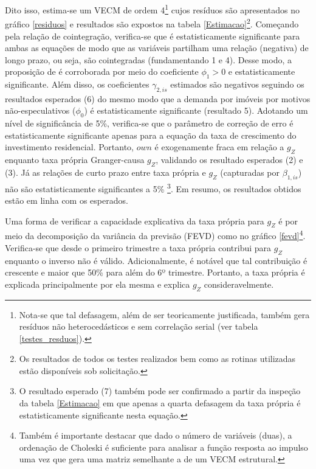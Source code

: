 Dito isso,  estima-se um VECM de ordem 4\footnote{Nota-se que tal defasagem, além de ser teoricamente justificada, também gera resíduos não heterocedásticos e sem correlação serial (ver tabela \ref{testes_resduos}).} cujos resíduos são apresentados no gráfico \ref{residuos} e resultados são expostos na tabela \ref{Estimacao}\footnote{Os resultados de todos os testes realizados bem como as rotinas utilizadas estão disponíveis sob solicitação.}.
Começando pela relação de cointegração, verifica-se que é estatisticamente significante para ambas as equações de modo que as variáveis partilham uma relação (negativa) de longo prazo, ou seja, são cointegradas (fundamentando 1 e 4).
Desse modo, a proposição de \textcite{teixeira_crescimento_2015} é corroborada por meio do coeficiente $\phi_1> 0$ e estatisticamente significante.
Além disso, os coeficientes $\gamma_{2,is}$ estimados são negativos seguindo os resultados esperados (6) do mesmo modo que a demanda por imóveis por motivos não-especulativos ($\phi_0$) é estatisticamente significante (resultado 5).
Adotando um nível de significância de 5\%, verifica-se que o parâmetro de correção de erro é estatisticamente significante apenas para a equação da taxa de crescimento do investimento residencial. Portanto, $own$ é exogenamente fraca em relação a $g_Z$ enquanto taxa própria Granger-causa $g_Z$, validando os resultado esperados (2) e (3).
Já as relações de curto prazo entre taxa própria e $g_Z$ (capturadas por $\beta_{1,is}$) não são estatisticamente significantes a 5\% \footnote{O resultado esperado (7) também pode ser confirmado a partir da inspeção da tabela \ref{Estimacao} em que apenas a quarta defasagem da taxa própria é estatisticamente significante nesta equação.}. Em resumo, os resultados obtidos estão em linha com os esperados. 

Uma forma de verificar a capacidade explicativa da taxa própria para $g_Z$ é por meio da decomposição da variância da previsão (FEVD) como no gráfico \ref{fevd}\footnote{Também é importante destacar que dado o número de variáveis (duas), a ordenação de Choleski é suficiente para analisar a função resposta ao impulso uma vez que gera uma matriz semelhante a de um VECM estrutural. 
}. Verifica-se que desde o primeiro trimestre a taxa própria contribui para $g_Z$ enquanto o inverso não é válido. Adicionalmente, é notável que tal contribuição é crescente e maior que 50\% para além do 6º trimestre. Portanto, a taxa própria é explicada principalmente por ela mesma e explica $g_Z$ consideravelmente.

